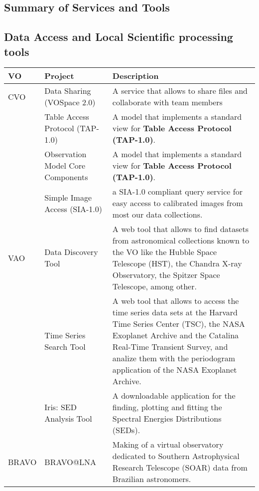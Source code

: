 \subsection{Summary of Services and Tools}
\subsection{Data Access and Local Scientific processing tools}
\begin{table*}[h!t]
	\centering
	\begin{tabular}{|l|l|p{12.5cm}|}
	\hline
	\textbf{VO} & \textbf{Project} & \textbf{Description}\\
	\hline
	CVO 	& Data Sharing (VOSpace 2.0) &  A service that allows to share files and collaborate with team members \\
			& Table Access Protocol (TAP-1.0) &	A model that implements a standard view for \textbf{Table Access Protocol (TAP-1.0)}. \\
			& Observation Model Core Components & A model that implements a standard view for \textbf{Table Access Protocol (TAP-1.0)}. \\
			& Simple Image Access (SIA-1.0) & a SIA-1.0 compliant query service for easy access to calibrated images from most our data collections. \\
	\hline
	VAO		& Data Discovery Tool & A web tool that allows to find datasets from astronomical collections known to the VO like the Hubble Space Telescope 
									(HST), the Chandra X-ray Observatory, the Spitzer Space Telescope, among other.\\
			& Time Series Search Tool & A web tool that allows to access the time series data sets at the Harvard Time Series Center (TSC), the NASA 
									Exoplanet Archive and the Catalina Real-Time Transient Survey, and analize them with the periodogram application 
									of the NASA Exoplanet Archive.\\
			& Iris: SED Analysis Tool & A downloadable application for the finding, plotting and fitting the 
			Spectral Energies Distributions (SEDs). \\
	\hline
	BRAVO	& BRAVO@LNA & Making of a virtual observatory dedicated to Southern Astrophysical Research Telescope (SOAR) data from Brazilian astronomers.  \\

\end{tabular}
\end{table*}
